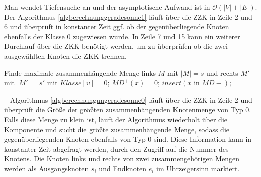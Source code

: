 Man wendet Tiefensuche an und der asymptotische Aufwand ist in $\mathcal{O}(|V|+|E|)$.\newpage
Der Algorithmus \ref{algberechnunggeradesonne1} läuft über die ZZK in Zeile 2 und 6 und überprüft in konstanter Zeit ggf. ob der gegenüberliegende Knoten ebenfalls der Klasse $0$ zugewiesen wurde. In Zeile 7 und 15 kann ein weiterer Durchlauf über die ZKK benötigt werden, um zu überprüfen ob die zwei ausgewählten Knoten die ZKK trennen.\newline
\vspace{-5mm}
\begin{algorithm}
\caption{$USG1(x)$}
\begin{algorithmic}[1]
\vspace{2mm} 
	\STATE Finde maximale zusammenhängende Menge links $M$ mit $|M|=s$ und rechts $M'$ mit $|M'|=s'$ mit 			$Klasse[v]=0$;
	\ENDIF
{} 
	\ENDIF 
{}  \STATE $MD^+(x)=0$;
									 	\STATE $insert(x \text{ in }  MD-)$;\ENDIF
\vspace{2mm}
\end{algorithmic}
\label{algberechnunggeradesonne1}
\end{algorithm}
\vspace{-3mm}
~\linebreak
Algorithmus \ref{algberechnungungeradesonne0} läuft über die ZZK in Zeile 2 und überprüft die Größe der größten zusammenhängenden Knotenmenge von Typ $0$. Falls diese Menge zu klein ist, läuft der Algorithmus wiederholt über die Komponente und sucht die größte zusammenhängende Menge, sodass die gegenüberliegenden Knoten ebenfalls von Typ $0$ sind. Diese Information kann in konstanter Zeit abgefragt werden, durch den Zugriff auf die Nummer des Knotens. Die Knoten links und rechts von zwei zusammengehörigen Mengen werden als Ausgangsknoten $s_i$ und Endknoten $e_i$ im Uhrzeigersinn markiert.\\

